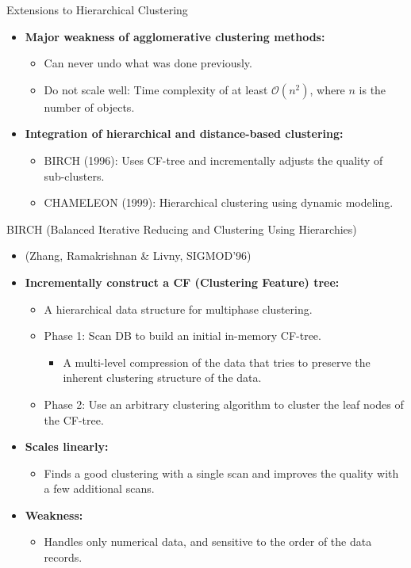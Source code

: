 \begin{frame}{Extensions to Hierarchical Clustering}
	\begin{itemize}
		\item \textbf{Major weakness of agglomerative clustering methods:}
		\begin{itemize}
			\item Can never undo what was done previously.
			\item Do not scale well: Time complexity of at least 
			$\mathcal{O}(n^2)$, where $n$ is the number of objects.
		\end{itemize}
		\item \textbf{Integration of hierarchical and distance-based 
		clustering:}
		\begin{itemize}
			\item BIRCH (1996): Uses CF-tree and incrementally adjusts the 
			quality of sub-clusters.
			\item CHAMELEON (1999): Hierarchical clustering using dynamic 
			modeling.
		\end{itemize}
	\end{itemize}
\end{frame}

\begin{frame}{BIRCH (Balanced Iterative Reducing and Clustering Using 
Hierarchies)}
	\begin{itemize}
		\item (Zhang, Ramakrishnan \& Livny, SIGMOD'96)
		\item \textbf{Incrementally construct a CF (Clustering Feature) tree:}
		\begin{itemize}
			\item A hierarchical data structure for multiphase clustering.
			\item Phase 1: Scan DB to build an initial in-memory CF-tree.
			\begin{itemize}
				\item A multi-level compression of the data that tries to 
				preserve the inherent clustering structure of the data.
			\end{itemize}
			\item Phase 2: Use an arbitrary clustering algorithm to cluster the 
			leaf nodes of the CF-tree.
		\end{itemize}
		\item \textbf{Scales linearly:}
		\begin{itemize}
			\item Finds a good clustering with a single scan and improves the 
			quality with a few additional scans.
		\end{itemize}
		\item \textbf{Weakness:}
		\begin{itemize}
			\item Handles only numerical data, and sensitive to the order of 
			the data records.
		\end{itemize}
	\end{itemize}
\end{frame}

